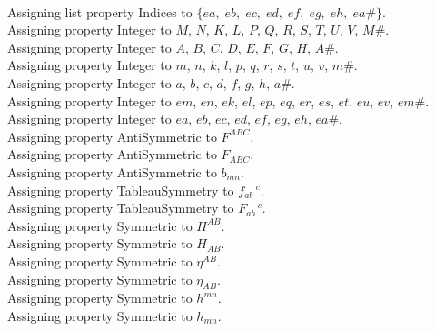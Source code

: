 \documentclass[11pt]{article}
\begin{document}
\\
Assigning list property Indices to $\{ea,\; eb,\; ec,\; ed,\; ef,\; eg,\; eh,\; ea\#\}$.
\\
Assigning property Integer to $M$, $N$, $K$, $L$, $P$, $Q$, $R$, $S$, $T$, $U$, $V$, $M\#$.
\\
Assigning property Integer to $A$, $B$, $C$, $D$, $E$, $F$, $G$, $H$, $A\#$.
\\
Assigning property Integer to $m$, $n$, $k$, $l$, $p$, $q$, $r$, $s$, $t$, $u$, $v$, $m\#$.
\\
Assigning property Integer to $a$, $b$, $c$, $d$, $f$, $g$, $h$, $a\#$.
\\
Assigning property Integer to $em$, $en$, $ek$, $el$, $ep$, $eq$, $er$, $es$, $et$, $eu$, $ev$, $em\#$.
\\
Assigning property Integer to $ea$, $eb$, $ec$, $ed$, $ef$, $eg$, $eh$, $ea\#$.
\\
Assigning property AntiSymmetric to ${F}^{A B C}$.
\\
Assigning property AntiSymmetric to ${F}_{A B C}$.
\\
Assigning property AntiSymmetric to ${b}_{m n}$.
\\
Assigning property TableauSymmetry to ${f}_{a b}\,^{c}$.
\\
Assigning property TableauSymmetry to ${F}_{a b}\,^{c}$.
\\
Assigning property Symmetric to ${H}^{A B}$.
\\
Assigning property Symmetric to ${H}_{A B}$.
\\
Assigning property Symmetric to ${\eta}^{A B}$.
\\
Assigning property Symmetric to ${\eta}_{A B}$.
\\
Assigning property Symmetric to ${h}^{m n}$.
\\
Assigning property Symmetric to ${h}_{m n}$.
\end{document}
